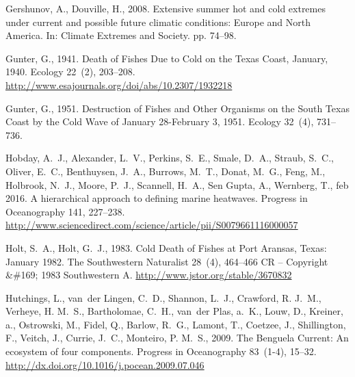 \documentclass[a4paper,10pt,review]{elsarticle}
\begin{document}
\begin{thebibliography}{50}
Gershunov, A., Douville, H., 2008. {Extensive summer hot and cold extremes
  under current and possible future climatic conditions: Europe and North
  America}. In: Climate Extremes and Society. pp. 74--98.

Gunter, G., 1941. {Death of Fishes Due to Cold on the Texas Coast, January,
  1940}. Ecology 22~(2), 203--208.
\newline\urlprefix\url{http://www.esajournals.org/doi/abs/10.2307/1932218}

Gunter, G., 1951. {Destruction of Fishes and Other Organisms on the South Texas
  Coast by the Cold Wave of January 28-February 3, 1951}. Ecology 32~(4),
  731--736.

Hobday, A.~J., Alexander, L.~V., Perkins, S.~E., Smale, D.~A., Straub, S.~C.,
  Oliver, E.~C., Benthuysen, J.~A., Burrows, M.~T., Donat, M.~G., Feng, M.,
  Holbrook, N.~J., Moore, P.~J., Scannell, H.~A., {Sen Gupta}, A., Wernberg,
  T., feb 2016. {A hierarchical approach to defining marine heatwaves}.
  Progress in Oceanography 141, 227--238.
\newline\urlprefix\url{http://www.sciencedirect.com/science/article/pii/S0079661116000057}

Holt, S.~A., Holt, G.~J., 1983. {Cold Death of Fishes at Port Aransas, Texas:
  January 1982}. The Southwestern Naturalist 28~(4), 464--466 CR -- Copyright
  {\&}{\#}169; 1983 Southwestern A.
\newline\urlprefix\url{http://www.jstor.org/stable/3670832}

Hutchings, L., van~der Lingen, C.~D., Shannon, L.~J., Crawford, R. J.~M.,
  Verheye, H. M.~S., Bartholomae, C.~H., van~der Plas, a.~K., Louw, D.,
  Kreiner, a., Ostrowski, M., Fidel, Q., Barlow, R.~G., Lamont, T., Coetzee,
  J., Shillington, F., Veitch, J., Currie, J.~C., Monteiro, P. M.~S., 2009.
  {The Benguela Current: An ecosystem of four components}. Progress in
  Oceanography 83~(1-4), 15--32.
\newline\urlprefix\url{http://dx.doi.org/10.1016/j.pocean.2009.07.046}


\end{thebibliography}
\end{document}
